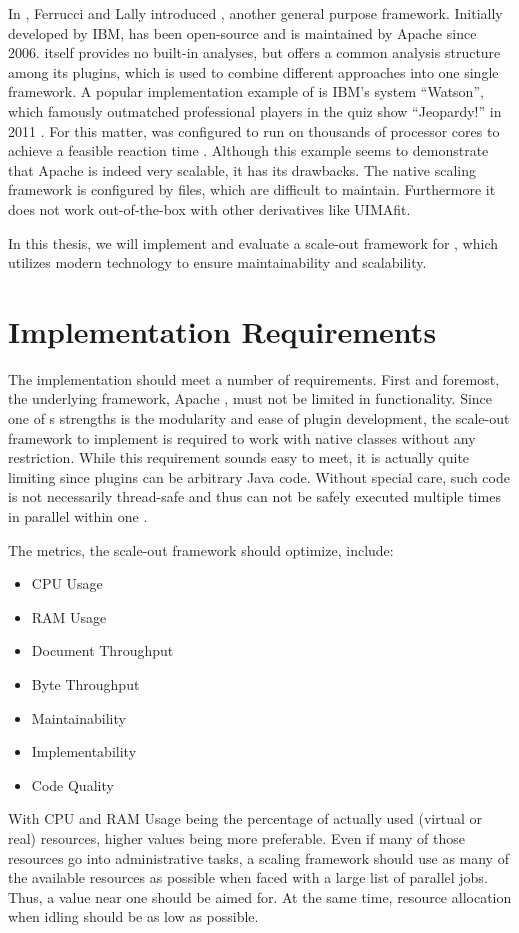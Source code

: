 In \cite{ferrucci2004uima}, Ferrucci and Lally introduced \uima{}, another general purpose \nlp{} framework. Initially developed by IBM, \uima{} has been open-source and is maintained by Apache since 2006. \uima{} itself provides no built-in \nlp{} analyses, but offers a common analysis structure among its plugins, which is used to combine different \nlp{} approaches into one single framework. A popular implementation example of \uima{} is IBM's \qa{} system ``Watson'', which famously outmatched professional players in the quiz show ``Jeopardy!'' in 2011 \cite{ferrucci2012introduction,epstein2012making}. For this matter, \uima{} was configured to run on thousands of processor cores to achieve a feasible reaction time \cite{epstein2012making}. Although this example seems to demonstrate that Apache \uima{} is indeed very scalable, it has its drawbacks. The native \uima{} scaling framework \uimaas{} is configured by \xml{} files, which are difficult to maintain. Furthermore it does not work out-of-the-box with other \uima{} derivatives like UIMAfit. 

In this thesis, we will implement and evaluate a scale-out framework for \uima{}, which utilizes modern technology to ensure maintainability and scalability.

\section{Implementation Requirements}
\label{sec:requirements}
The implementation should meet a number of requirements. First and foremost, the underlying framework, Apache \uima{}, must not be limited in functionality. Since one of \uima{}s strengths is the modularity and ease of plugin development, the scale-out framework to implement is required to work with native \uima{} classes without any restriction. While this requirement sounds easy to meet, it is actually quite limiting since \uima{} plugins can be arbitrary Java code. Without special care, such code is not necessarily thread-safe and thus can not be safely executed multiple times in parallel within one \jvm{}.

The metrics, the scale-out framework should optimize, include:
\begin{itemize}
\item CPU Usage
\item RAM Usage
\item Document Throughput
\item Byte Throughput
\item Maintainability
\item Implementability
\item Code Quality
\end{itemize}
With CPU and RAM Usage being the percentage of actually used (virtual or real) resources, higher values being more preferable. Even if many of those resources go into administrative tasks, a scaling framework should use as many of the available resources as possible when faced with a large list of parallel jobs. Thus, a value near one should be aimed for. At the same time, resource allocation when idling should be as low as possible.

